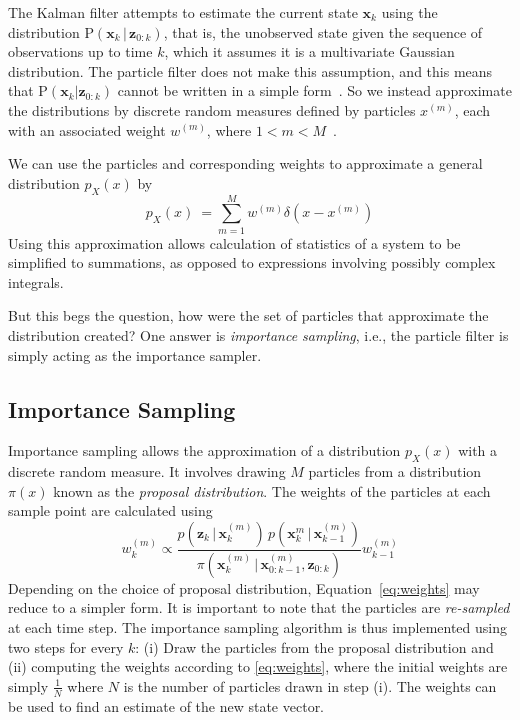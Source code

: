 \documentclass[11pt]{article}
\begin{document}
The Kalman filter attempts to estimate the current state $\mathbf{x}_{k}$ using
the distribution $\textrm{P}(\mathbf{x}_{k}\,|\,\mathbf{z}_{0:k})$, that is, the
unobserved state given the sequence of observations up to time $k$, which
it assumes it is a multivariate Gaussian distribution. The particle filter does
not make this assumption, and this means that
$\textrm{P}(\mathbf{x}_{k}|\mathbf{z}_{0:k})$ cannot be written in a simple
form~{\cite{ref:1}}. So we instead approximate the distributions
by discrete random measures defined by particles $x^{(m)}$, each with an
associated weight $w^{(m)}$, where $1 < m < M$~{\cite{ref:2}}.

We can use the particles and corresponding weights to approximate a general
distribution $p_{X}(x)$ by
\begin{equation}
p_{X}(x) ~= \sum\limits_{m=1}^{M}{w^{(m)}\delta(x-x^{(m)})}
\end{equation}
Using this approximation allows calculation of statistics of a system to be
simplified to summations, as opposed to expressions involving possibly complex
integrals. 

But this begs the question, how were the set of particles that approximate the
distribution created? One answer is \emph{importance sampling}, i.e., the
particle filter is simply acting as the importance sampler.

\subsection{Importance Sampling}
Importance sampling allows the approximation of a distribution $p_{X}(x)$ with
a discrete random measure. It involves drawing $M$ particles from a
distribution $\pi(x)$ known as the \emph{proposal distribution}. The
weights of the particles at each sample point are calculated using
\begin{equation} \label{eq:weights}
w^{(m)}_{k} \propto
\frac
{p(\mathbf{z}_{k}\,|\,\mathbf{x}^{(m)}_{k})\,p(\mathbf{x}^{m}_{k}\,|\,\mathbf{x}
^ {(m)}_{ k-1})}{ \pi(\mathbf{x}^{(m)} _k\,|\,\mathbf{x}^{
(m)}_{0:k-1}, \mathbf{z}_{0:k})}w^{(m)}_{k-1}
\end{equation}
Depending on the choice of proposal distribution, Equation~\ref{eq:weights}
may reduce to a simpler form. It is important to note that the particles are
\emph{re-sampled} at each time step. The importance sampling algorithm is thus
implemented using two steps for every $k$: (i) Draw the particles from the
proposal distribution and (ii) computing the weights according to
\ref{eq:weights}, where the initial weights are simply $\frac{1}{N}$ where $N$
is the number of particles drawn in step (i). The weights can be used to find an
estimate of the new state vector.
\end{document}

